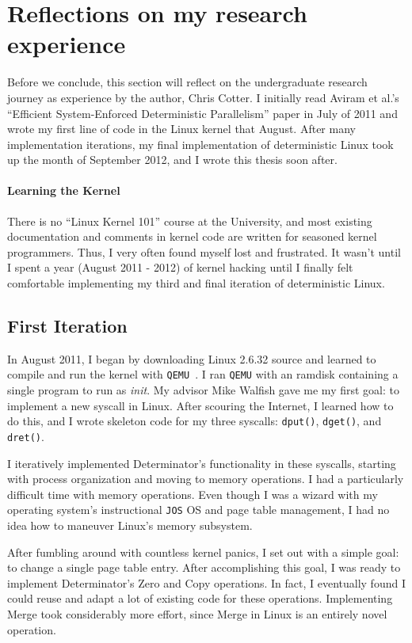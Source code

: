 
\section{Reflections on my research experience}
Before we conclude, this section will reflect on the undergraduate research
journey as experience by the author, Chris Cotter. I initially read
Aviram et al.'s ``Efficient System-Enforced Deterministic Parallelism'' paper
in July of 2011 and wrote my first line of code in the Linux kernel that August.
After many implementation iterations, my final implementation of deterministic
Linux took up the month of September 2012, and I wrote this thesis soon after.

\paragraph{Learning the Kernel}
There is no ``Linux Kernel 101'' course at the University, and most existing
documentation and comments in kernel code are written for seasoned kernel
programmers. Thus, I very often found myself lost and frustrated. It wasn't
until I spent a year (August 2011 - 2012) of kernel hacking until I finally
felt comfortable implementing my third and final iteration of deterministic
Linux.

\subsection{First Iteration}
In August 2011, I began by downloading Linux 2.6.32 source and learned to
compile and run the kernel with {\tt QEMU}~\cite{qemu}. I ran
{\tt QEMU} with an ramdisk containing a single program to run as \emph{init}.
My advisor Mike Walfish gave me my first goal: to implement a new syscall
in Linux. After scouring the Internet, I learned how to do this, and I wrote
skeleton code for my three syscalls: {\tt dput()}, {\tt dget()}, and
{\tt dret()}.

I iteratively implemented Determinator's functionality in these syscalls,
starting with process organization and moving to memory operations. I had a
particularly difficult time with memory operations. Even though I was a wizard
with my operating system's instructional {\tt JOS} OS and page table management,
I had no idea how to maneuver Linux's memory subsystem.

After fumbling around with countless kernel panics, I set out with a simple
goal: to change a single page table entry. After accomplishing this goal,
I was ready to implement Determinator's Zero and Copy operations. In fact, I
eventually found I could reuse and adapt a lot of existing code for these
operations. Implementing Merge took considerably more effort, since Merge in
Linux is an entirely novel operation.

